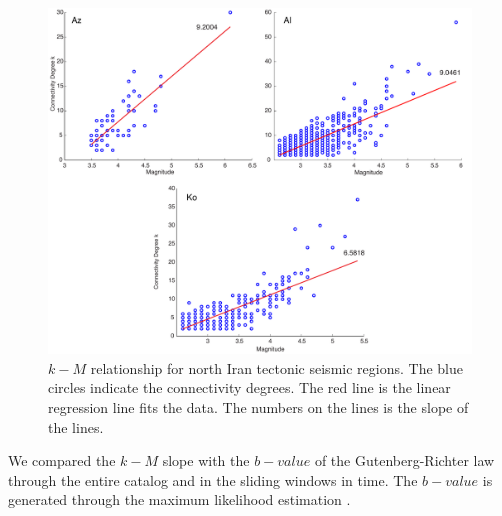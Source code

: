 \begin{figure} [ht]
\centering
\includegraphics[scale=0.35]{figures/pdf/Figure06.pdf} 
\caption{ $k-M$ relationship for north Iran tectonic seismic regions. The blue circles indicate the connectivity degrees. The red line is the linear regression line fits the data. The numbers on the lines is the slope of the lines.}
\label{fig:k_m_plot_m}
\end{figure}
 \noindent
We compared the  $k-M$  slope with the  $b-value$  of the Gutenberg-Richter law through the entire catalog and in the sliding windows in time. The  $b-value$  is generated through the maximum likelihood estimation  \citep{Aki1965} .

